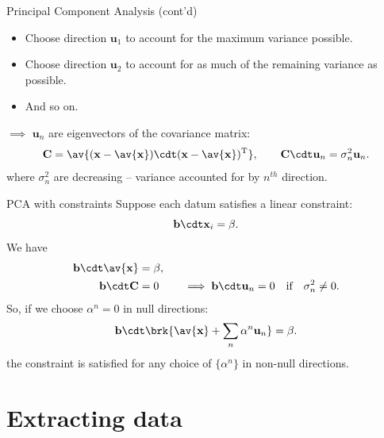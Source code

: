 \documentclass{beamer}
\begin{document}
\begin{frame}{Principal Component Analysis (cont'd)}
%
 \begin{itemize}
   \item Choose direction $\mathbf{u}_1$ to account for the maximum variance possible.
   \item Choose direction $\mathbf{u}_2$ to account for as much of the remaining variance as possible.
   \item And so on.
 \end{itemize}

 $\implies$ $\mathbf{u}_n$ are eigenvectors of the covariance matrix:
 \begin{equation*}
   \mathbf{C} = \av{ (\mathbf{x}-\av{\mathbf{x}})\cdt(\mathbf{x}-\av{\mathbf{x}})^\mathrm{T} },
   \qquad
   \mathbf{C} \cdt \mathbf{u}_n = \sigma^2_n \mathbf{u}_n.
 \end{equation*}
 where $\sigma^2_n$ are decreasing -- variance accounted for by $n^{th}$ direction.
%
\end{frame}


\begin{frame}{PCA with constraints}
%
 Suppose each datum satisfies a \alert{linear} constraint:
 \begin{equation*}
   \mathbf{b}\cdt \mathbf{x}_i = \beta.
 \end{equation*}
 We have
 \begin{equation*}
 \begin{aligned}
   \mathbf{b}\cdt \av{\mathbf{x}} &= \beta, \\
   \mathbf{b}\cdt \mathbf{C} &= 0 \qquad \implies
   \mathbf{b}\cdt \mathbf{u}_n = 0 
   \quad\text{if}\quad \sigma^2_n \neq 0.
 \end{aligned}
 \end{equation*}
 So, if we choose $\alpha^n=0$ in null directions:
 \begin{equation*}
   \mathbf{b}\cdt \brk{ \av{\mathbf{x}} + \sum_n \alpha^n \mathbf{u}_n } = \beta.
 \end{equation*}
 \ie the constraint is satisfied for any choice of $\{\alpha^n\}$ in non-null directions.
%
\end{frame}

\section{Extracting data}
\end{document}
